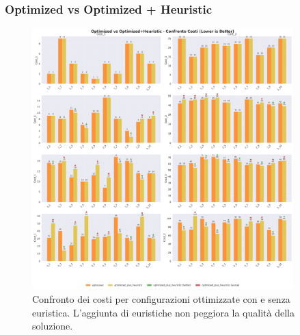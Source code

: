 \documentclass[11pt,a4paper]{article}
\begin{document}
\subsubsection{Optimized vs Optimized + Heuristic}
\begin{figure}[H]
  \centering
  \includegraphics[width=0.9\textwidth]{../Results/graphs/cost_comparison_optimized_vs_optimized_heuristic.png}
  \caption{Confronto dei costi per configurazioni ottimizzate con e senza euristica. 
  L’aggiunta di euristiche non peggiora la qualità della soluzione.}
\end{figure}
\end{document}
